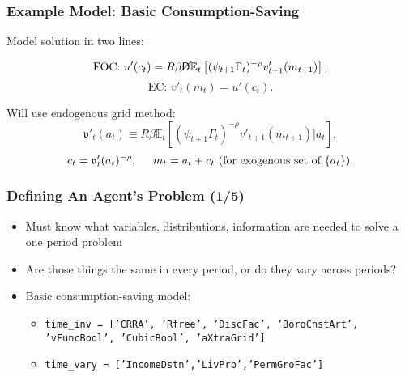 \documentclass[11pt,handout]{beamer}
\newcommand{\E}{\mathbb{E}}
\newcommand{\bi}{\begin{itemize}}
\newcommand{\ei}{\end{itemize}}
\newcommand{\Die}{\mathsf{D}}
\newcommand{\Live}{\cancel{\Die}}
\begin{document}
\begin{frame}
\frametitle{Example Model: Basic Consumption-Saving}

Model solution in two lines:

\begin{equation*}
\text{FOC: } u'(c_t) = R \beta \Live \E_t \left[(\psi_{t+1} \Gamma_t)^{-\rho} v'_{t+1}(m_{t+1}) \right],
\end{equation*}
\begin{equation*}
\text{EC: } v'_t(m_t) = u'(c_t).
\end{equation*}

Will use endogenous grid method:
\begin{equation*}
\mathfrak{v}'_t(a_t) \equiv R \beta \E_t \left[(\psi_{t+1} \Gamma_t)^{-\rho} v'_{t+1}(m_{t+1}) | a_t\right],
\end{equation*}
\begin{equation*}
c_t = \mathfrak{v}'_t(a_t)^{-\rho}, \hspace{0.5cm} m_t = a_t + c_t \text{ (for exogenous set of } \{a_t\} \text{)}.
\end{equation*}
\end{frame}



\begin{frame}
\frametitle{Defining An Agent's Problem (1/5)}
\bi
\item <1->Must know what variables, distributions, information are needed to solve a one period problem

\item <1->Are those things the same in every period, or do they vary across periods?

\item <2->Basic consumption-saving model:
\bi
\item \texttt{time\_inv = ['CRRA', 'Rfree', 'DiscFac', 'BoroCnstArt', 'vFuncBool', 'CubicBool', 'aXtraGrid']}

\item \texttt{time\_vary = ['IncomeDstn','LivPrb','PermGroFac']}
\ei
\ei
\end{frame}
\end{document}
